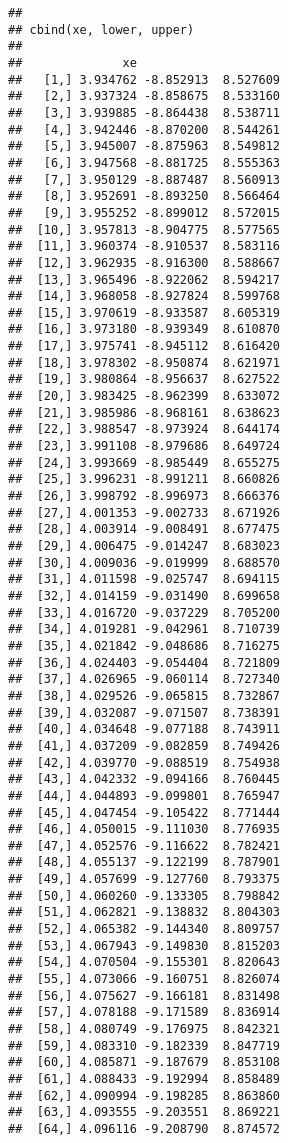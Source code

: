 \documentclass[]{book}
\theoremstyle{definition}
\theoremstyle{definition}
\theoremstyle{definition}
\theoremstyle{remark}
\begin{document}
\begin{verbatim}
## 
## cbind(xe, lower, upper)
## 
##              xe                    
##   [1,] 3.934762 -8.852913  8.527609
##   [2,] 3.937324 -8.858675  8.533160
##   [3,] 3.939885 -8.864438  8.538711
##   [4,] 3.942446 -8.870200  8.544261
##   [5,] 3.945007 -8.875963  8.549812
##   [6,] 3.947568 -8.881725  8.555363
##   [7,] 3.950129 -8.887487  8.560913
##   [8,] 3.952691 -8.893250  8.566464
##   [9,] 3.955252 -8.899012  8.572015
##  [10,] 3.957813 -8.904775  8.577565
##  [11,] 3.960374 -8.910537  8.583116
##  [12,] 3.962935 -8.916300  8.588667
##  [13,] 3.965496 -8.922062  8.594217
##  [14,] 3.968058 -8.927824  8.599768
##  [15,] 3.970619 -8.933587  8.605319
##  [16,] 3.973180 -8.939349  8.610870
##  [17,] 3.975741 -8.945112  8.616420
##  [18,] 3.978302 -8.950874  8.621971
##  [19,] 3.980864 -8.956637  8.627522
##  [20,] 3.983425 -8.962399  8.633072
##  [21,] 3.985986 -8.968161  8.638623
##  [22,] 3.988547 -8.973924  8.644174
##  [23,] 3.991108 -8.979686  8.649724
##  [24,] 3.993669 -8.985449  8.655275
##  [25,] 3.996231 -8.991211  8.660826
##  [26,] 3.998792 -8.996973  8.666376
##  [27,] 4.001353 -9.002733  8.671926
##  [28,] 4.003914 -9.008491  8.677475
##  [29,] 4.006475 -9.014247  8.683023
##  [30,] 4.009036 -9.019999  8.688570
##  [31,] 4.011598 -9.025747  8.694115
##  [32,] 4.014159 -9.031490  8.699658
##  [33,] 4.016720 -9.037229  8.705200
##  [34,] 4.019281 -9.042961  8.710739
##  [35,] 4.021842 -9.048686  8.716275
##  [36,] 4.024403 -9.054404  8.721809
##  [37,] 4.026965 -9.060114  8.727340
##  [38,] 4.029526 -9.065815  8.732867
##  [39,] 4.032087 -9.071507  8.738391
##  [40,] 4.034648 -9.077188  8.743911
##  [41,] 4.037209 -9.082859  8.749426
##  [42,] 4.039770 -9.088519  8.754938
##  [43,] 4.042332 -9.094166  8.760445
##  [44,] 4.044893 -9.099801  8.765947
##  [45,] 4.047454 -9.105422  8.771444
##  [46,] 4.050015 -9.111030  8.776935
##  [47,] 4.052576 -9.116622  8.782421
##  [48,] 4.055137 -9.122199  8.787901
##  [49,] 4.057699 -9.127760  8.793375
##  [50,] 4.060260 -9.133305  8.798842
##  [51,] 4.062821 -9.138832  8.804303
##  [52,] 4.065382 -9.144340  8.809757
##  [53,] 4.067943 -9.149830  8.815203
##  [54,] 4.070504 -9.155301  8.820643
##  [55,] 4.073066 -9.160751  8.826074
##  [56,] 4.075627 -9.166181  8.831498
##  [57,] 4.078188 -9.171589  8.836914
##  [58,] 4.080749 -9.176975  8.842321
##  [59,] 4.083310 -9.182339  8.847719
##  [60,] 4.085871 -9.187679  8.853108
##  [61,] 4.088433 -9.192994  8.858489
##  [62,] 4.090994 -9.198285  8.863860
##  [63,] 4.093555 -9.203551  8.869221
##  [64,] 4.096116 -9.208790  8.874572

\end{verbatim}
\end{document}
